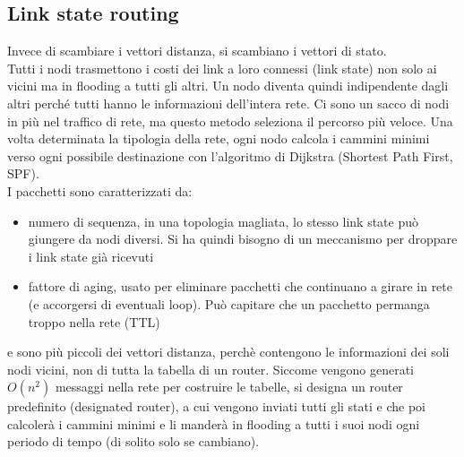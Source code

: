 \documentclass[11pt, oneside]{article}   	%
\begin{document}
\subsection*{Link state routing}
Invece di scambiare i vettori distanza, si scambiano i vettori di stato.\\
Tutti i nodi trasmettono i costi dei link a loro connessi (link state) non solo ai vicini ma in flooding a tutti gli altri. Un nodo diventa quindi indipendente dagli altri perché tutti hanno le informazioni dell'intera rete. Ci sono un sacco di nodi in più nel traffico di rete, ma questo metodo seleziona il percorso più veloce.
Una volta determinata la tipologia della rete, ogni nodo calcola i cammini minimi verso ogni possibile destinazione con l'algoritmo di Dijkstra (Shortest Path First, SPF).\\
I pacchetti sono caratterizzati da:
\begin{itemize}
\item numero di sequenza, in una topologia magliata, lo stesso link state può giungere da nodi diversi. Si ha quindi bisogno di un meccanismo per droppare i link state già ricevuti
\item fattore di aging, usato per eliminare pacchetti che continuano a girare in rete (e accorgersi di eventuali loop). Può capitare che un pacchetto permanga troppo nella rete (TTL)
\end{itemize}
e sono più piccoli dei vettori distanza, perchè contengono le informazioni dei soli nodi vicini, non di tutta la tabella di un router.
Siccome vengono generati $O(n^2)$ messaggi nella rete per costruire le tabelle, si designa un router predefinito (designated router), a cui vengono inviati tutti gli stati e che poi calcolerà i cammini minimi e li manderà in flooding a tutti i suoi nodi ogni periodo di tempo (di solito solo se cambiano).
\end{document}
